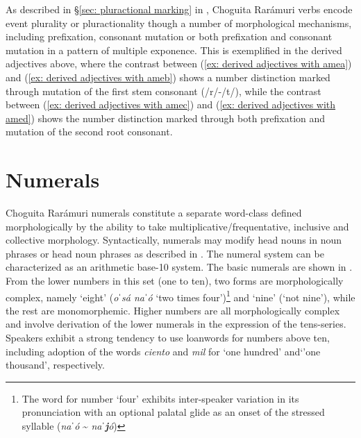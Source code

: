 
As described in §\ref{sec: pluractional marking} in , Choguita Rarámuri verbs encode event plurality or pluractionality though a number of morphological mechanisms, including prefixation, consonant mutation or both prefixation and consonant mutation in a pattern of multiple exponence. This is exemplified in the derived adjectives above, where the contrast between (\ref{ex: derived adjectives with amea}) and (\ref{ex: derived adjectives with ameb}) shows a number distinction marked through mutation of the first stem consonant (/r/-/t/), while the contrast between (\ref{ex: derived adjectives with amec}) and (\ref{ex: derived adjectives with amed}) shows the number distinction marked through both prefixation and mutation of the second root consonant.

\section{Numerals}
\label{sec: numerals}

Choguita Rarámuri numerals constitute a separate word-class defined morphologically by the ability to take multiplicative/frequentative, inclusive and collective morphology. Syntactically, numerals may modify head nouns in noun phrases or head noun phrases as described in . The numeral system can be characterized as an arithmetic base-10 system. The basic numerals are shown in . From the lower numbers in this set (one to ten), two forms are morphologically complex, namely `eight' (\textit{oˈsá naˈó} `two times four')\footnote{The word for number `four' exhibits inter-speaker variation in its pronunciation with an optional palatal glide as an onset of the stressed syllable (\textit{naˈó} {\textasciitilde} \textit{naˈ\textbf{j}ó})} and `nine' (`not nine'), while the rest are monomorphemic. Higher numbers are all morphologically complex and involve derivation of the lower numerals in the expression of the tens-series. Speakers exhibit a strong tendency to use  loanwords for numbers above ten, including adoption of the  words \textit{ciento} and \textit{mil} for `one hundred' and`'one thousand', respectively.

